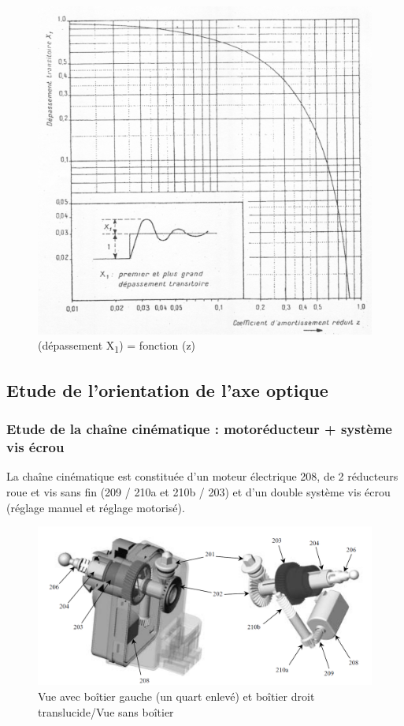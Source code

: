 \begin{figure}[!h]
  \centering
  \includegraphics[width=0.6\linewidth]{img/phare6}
  \caption{(dépassement X\textsubscript{1}) = fonction (z)}  
  \label{phare6}
\end{figure}

\subsection{Etude de l'orientation de l'axe optique}

\subsubsection{Etude de la chaîne cinématique : motoréducteur + système vis écrou}

La chaîne cinématique est constituée d'un moteur électrique 208, de 2 réducteurs roue et vis sans fin (209 / 210a et 210b / 203) et d'un double système vis écrou (réglage manuel et réglage motorisé).

\begin{figure}[!h]
  \centering
  \includegraphics[width=0.8\linewidth]{img/phare7}
  \caption{Vue avec boîtier gauche (un quart enlevé) et boîtier droit translucide/Vue sans boîtier}  
  \label{phare7}
\end{figure}

